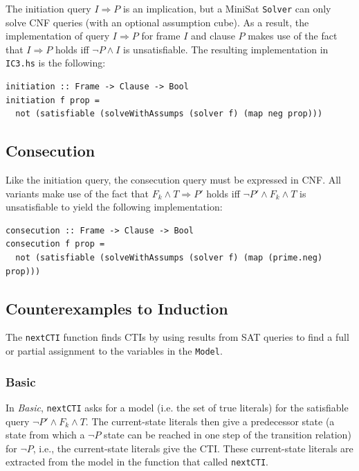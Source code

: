 \documentclass[12pt,a4paper,twoside,openright]{report}
\begin{document}
{{The initiation query $I \Rightarrow P$ is an implication, but a MiniSat \verb,Solver, can only
solve CNF queries (with an optional assumption cube).
As a result, the implementation of query $I \Rightarrow P$ for frame $I$ and
clause $P$ makes use of the fact that
$I \Rightarrow P$ holds iff $\neg P \wedge I$ is unsatisfiable.
The resulting implementation in \verb,IC3.hs, is the following:

\begin{lstlisting}
initiation :: Frame -> Clause -> Bool
initiation f prop =
  not (satisfiable (solveWithAssumps (solver f) (map neg prop)))
\end{lstlisting}

\subsection{Consecution}

Like the initiation query, the consecution query must be expressed in CNF.
All variants make use of the fact that
$F_k \wedge T \Rightarrow P'$ holds iff $\neg P' \wedge F_k \wedge T$ is unsatisfiable
to yield the following implementation:
\begin{lstlisting}
consecution :: Frame -> Clause -> Bool
consecution f prop =
  not (satisfiable (solveWithAssumps (solver f) (map (prime.neg) prop)))
\end{lstlisting}

\subsection{Counterexamples to Induction}

The \verb,nextCTI, function finds CTIs by
using results from SAT queries to find a full or partial assignment to
the variables in the \verb,Model,.

\subsubsection{Basic}
In \emph{Basic}, \verb,nextCTI, asks for a model
(i.e. the set of true literals) for the satisfiable query $\neg P' \wedge F_k \wedge T$.
The current-state literals then give a predecessor state (a state from which
a $\neg P$ state can be reached in one step of the transition relation) for $\neg P$,
i.e., the current-state literals give the CTI.
These current-state literals are extracted from the model in the function that
called \verb,nextCTI,.

}}
\end{document}
